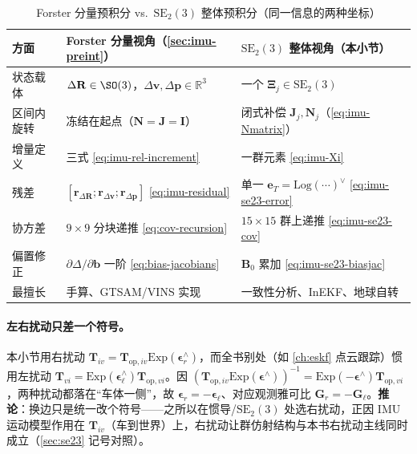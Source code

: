 \begin{table}[H]\centering\small
\caption{Forster 分量预积分 vs.\ $\mathrm{SE}_2(3)$ 整体预积分（同一信息的两种坐标）}
\label{tab:imu-se23-vs-forster}
\begin{tabular}{lll}
\toprule
方面 & Forster 分量视角（\cref{sec:imu-preint}）& $\mathrm{SE}_2(3)$ 整体视角（本小节）\\
\midrule
状态载体 & $\Delta\mathbf R\in\SO(3)$，$\Delta\mathbf v,\Delta\mathbf p\in\mathbb R^3$ & 一个 $\boldsymbol\Xi_j\in\mathrm{SE}_2(3)$ \\
区间内旋转 & 冻结在起点（$\mathbf N=\mathbf J=\mathbf I$）& 闭式补偿 $\mathbf J_j,\mathbf N_j$（\cref{eq:imu-Nmatrix}）\\
增量定义 & 三式 \cref{eq:imu-rel-increment} & 一群元素 \cref{eq:imu-Xi}\\
残差 & $[\mathbf r_{\Delta\mathbf R};\mathbf r_{\Delta\mathbf v};\mathbf r_{\Delta\mathbf p}]$ \cref{eq:imu-residual} & 单一 $\mathbf e_T=\mathrm{Log}(\cdots)^\vee$ \cref{eq:imu-se23-error}\\
协方差 & $9\times9$ 分块递推 \cref{eq:cov-recursion} & $15\times15$ 群上递推 \cref{eq:imu-se23-cov}\\
偏置修正 & $\partial\Delta/\partial\mathbf b$ 一阶 \cref{eq:bias-jacobians} & $\mathbf B_0$ 累加 \cref{eq:imu-se23-biasjac}\\
最擅长 & 手算、GTSAM/VINS 实现 & 一致性分析、InEKF、地球自转 \\
\bottomrule
\end{tabular}
\end{table}

\paragraph{左右扰动只差一个符号。}
本小节用右扰动 $\mathbf T_{iv}=\mathbf T_{\mathrm{op},iv}\mathrm{Exp}(\boldsymbol\epsilon_r^\wedge)$，而全书别处（如 \cref{ch:eskf} 点云跟踪）惯用左扰动 $\mathbf T_{vi}=\mathrm{Exp}(\boldsymbol\epsilon_\ell^\wedge)\mathbf T_{\mathrm{op},vi}$。因 $(\mathbf T_{\mathrm{op},iv}\mathrm{Exp}(\boldsymbol\epsilon^\wedge))^{-1}=\mathrm{Exp}(-\boldsymbol\epsilon^\wedge)\mathbf T_{\mathrm{op},vi}$，两种扰动都落在“车体一侧”，故 $\boldsymbol\epsilon_r=-\boldsymbol\epsilon_\ell$、对应观测雅可比 $\mathbf G_r=-\mathbf G_\ell$\cite{barfoot2024state}。\textbf{推论}：换边只是统一改个符号——之所以在惯导/$\mathrm{SE}_2(3)$ 处选右扰动，正因 IMU 运动模型作用在 $\mathbf T_{iv}$（车到世界）上，右扰动让群仿射结构与本书右扰动主线同时成立（\cref{sec:se23} 记号对照）。

